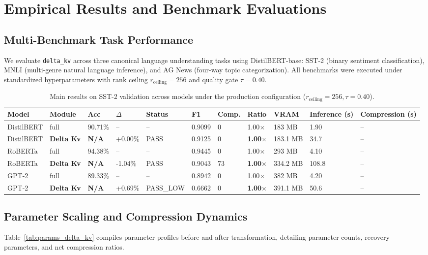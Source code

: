 \section{Empirical Results and Benchmark Evaluations}
\label{sec:results}

\subsection{Multi-Benchmark Task Performance}
We evaluate \texttt{delta\_kv} across three canonical language understanding tasks using DistilBERT-base: SST-2 (binary sentiment classification), MNLI (multi-genre natural language inference), and AG News (four-way topic categorization). All benchmarks were executed under standardized hyperparameters with rank ceiling $r_{\mathrm{ceiling}} = 256$ and quality gate $\tau = 0.40$.

\begin{table}[t]
\centering
\small
\begin{tabular}{lllllllllll}
\toprule
\textbf{Model} & \textbf{Module} & \textbf{Acc} & \textbf{$\Delta$} & \textbf{Status} & \textbf{F1} & \textbf{Comp.} & \textbf{Ratio} & \textbf{VRAM} & \textbf{Inference (s)} & \textbf{Compression (s)} \\
\midrule
DistilBERT & full & 90.71\% & -- & -- & 0.9099 & 0 & 1.00$\times$ & 183 MB & 1.90 & -- \\
DistilBERT & \textbf{Delta Kv} & \textbf{N/A} & +0.00\% & PASS & 0.9125 & 0 & \textbf{1.00$\times$} & 183.1 MB & 34.7 & -- \\
RoBERTa & full & 94.38\% & -- & -- & 0.9445 & 0 & 1.00$\times$ & 293 MB & 4.10 & -- \\
RoBERTa & \textbf{Delta Kv} & \textbf{N/A} & -1.04\% & PASS & 0.9043 & 73 & \textbf{1.00$\times$} & 334.2 MB & 108.8 & -- \\
GPT-2 & full & 89.33\% & -- & -- & 0.8942 & 0 & 1.00$\times$ & 382 MB & 4.20 & -- \\
GPT-2 & \textbf{Delta Kv} & \textbf{N/A} & +0.69\% & PASS_LOW & 0.6662 & 0 & \textbf{1.00$\times$} & 391.1 MB & 50.6 & -- \\
\bottomrule
\end{tabular}
\caption{Main results on SST-2 validation across models under the production configuration ($r_{\mathrm{ceiling}}=256, \tau=0.40$).}
\label{tab:main_sst2}
\end{table}

\subsection{Parameter Scaling and Compression Dynamics}
Table~\ref{tab:params_delta_kv} compiles parameter profiles before and after transformation, detailing parameter counts, recovery parameters, and net compression ratios.

